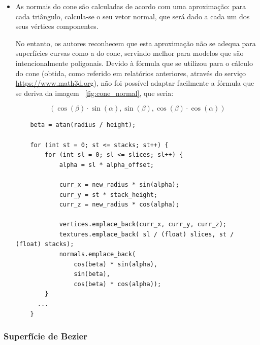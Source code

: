 \documentclass[11pt,a4paper]{report}%
\begin{document}
\begin{itemize}
  \item As normais do cone são calculadas de acordo com uma aproximação: para cada triângulo,
  calcula-se o seu vetor normal, que será dado a cada um dos seus vértices componentes.

  No entanto, os autores reconhecem que esta aproximação não se adequa para superfícies curvas
  como a do cone, servindo melhor para modelos que são intencionalmente poligonais.
  Devido à fórmula que se utilizou para o cálculo do cone (obtida, como referido em relatórios
  anteriores, através do serviço \url{https://www.math3d.org}), não foi possível adaptar facilmente a fórmula
  que se deriva da imagem ~\ref{fig:cone_normal}, que seria:

  $$
  (\cos(\beta) \cdot \sin(\alpha), \sin(\beta), \cos(\beta) \cdot \cos(\alpha) )
  $$

  \begin{lstlisting}
    beta = atan(radius / height);

    for (int st = 0; st <= stacks; st++) {
        for (int sl = 0; sl <= slices; sl++) {
            alpha = sl * alpha_offset;
    
            curr_x = new_radius * sin(alpha);
            curr_y = st * stack_height;
            curr_z = new_radius * cos(alpha);
    
            vertices.emplace_back(curr_x, curr_y, curr_z);
            textures.emplace_back( sl / (float) slices, st / (float) stacks);
            normals.emplace_back(
                cos(beta) * sin(alpha),
                sin(beta),
                cos(beta) * cos(alpha));
        }
      ...
    }
  \end{lstlisting}

\end{itemize}

\subsubsection{Superfície de Bezier}
\end{document}
